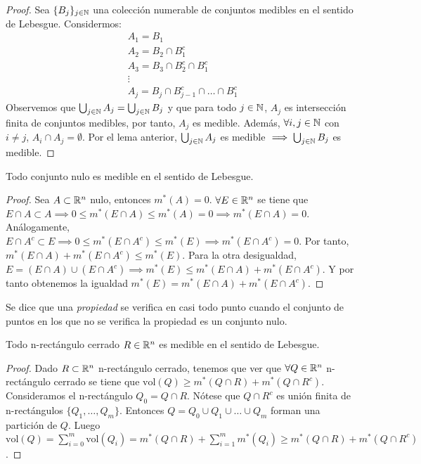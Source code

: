 \begin{proof}
    Sea $\{B_j\}_{j \in \mathbb{N}}$ una colección numerable de conjuntos medibles en el sentido de Lebesgue. Considermos:
    \[\begin{matrix}
        A_1 = B_1\\
        A_2 = B_2 \cap B_1^c\\
        A_3 = B_3 \cap B_2^c \cap B_1^c\\
        \vdots\\
        A_j = B_j \cap B_{j-1}^c \cap \ldots \cap B_1^c
    \end{matrix}\]
    Observemos que $\bigcup_{j \in \mathbb{N}} A_j = \bigcup_{j \in \mathbb{N}} B_j$ y que para todo $j \in \mathbb{N}$, $A_j$ es intersección finita de conjuntos medibles, por tanto, $A_j$ es medible. Además, $\forall i,j \in \mathbb{N}$ con $i \neq j$, $A_i \cap A_j = \emptyset$. Por el lema anterior, $\bigcup_{j \in \mathbb{N}} A_j$ es medible $\implies \bigcup_{j \in \mathbb{N}} B_j$ es medible.
\end{proof}

\begin{proposición}
    Todo conjunto nulo es medible en el sentido de Lebesgue.
\end{proposición}

\begin{proof}
    Sea $A \subset \mathbb{R}^n$ nulo, entonces $m^*(A) = 0$. $\forall E \in \mathbb{R}^n$ se tiene que $E \cap A \subset A \implies 0 \leq m^*(E \cap A) \leq m^*(A) = 0 \implies m^*(E \cap A) = 0$. Análogamente, $E \cap A^c \subset E \implies 0 \leq m^*(E \cap A^c) \leq m^*(E) \implies m^*(E \cap A^c) = 0$. Por tanto, $m^*(E \cap A) + m^*(E \cap A^c) \leq m^*(E)$. Para la otra desigualdad, $E = (E \cap A) \cup (E \cap A^c) \implies m^*(E) \leq m^*(E \cap A) + m^*(E \cap A^c)$. Y por tanto obtenemos la igualdad $m^*(E) = m^*(E \cap A) + m^*(E \cap A^c)$.
\end{proof}

\begin{definición}
    Se dice que una \textit{propiedad} se verifica en casi todo punto cuando el conjunto de puntos en los que no se verifica la propiedad es un conjunto nulo.
\end{definición}

\begin{proposición}
    Todo n-rectángulo cerrado $R \in \mathbb{R}^n$ es medible en el sentido de Lebesgue.
\end{proposición}

\begin{proof}
    Dado $R \subset \mathbb{R}^n$ n-rectángulo cerrado, tenemos que ver que $\forall Q \in \mathbb{R}^n$ n-rectángulo cerrado se tiene que $\text{vol}(Q) \geq m^*(Q \cap R) + m^*(Q \cap R^c)$. Consideramos el n-rectángulo $Q_0 = Q \cap R$. Nótese que $Q \cap R^c$ es unión finita de n-rectángulos $\{Q_1,\ldots, Q_m\}$. Entonces $Q = Q_0 \cup Q_1 \cup \ldots \cup Q_m$ forman una partición de $Q$. Luego $\text{vol}(Q) = \sum_{i=0}^m \text{vol}(Q_i) = m^*(Q \cap R) + \sum_{i=1}^m m^*(Q_i) \geq m^*(Q \cap R) + m^*(Q \cap R^c)$.
\end{proof}

